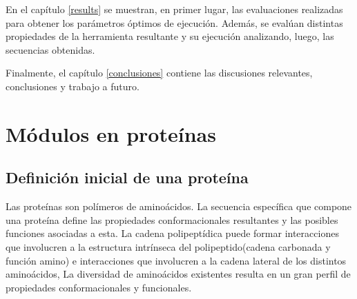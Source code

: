 En el capítulo \ref{results} se muestran, en primer lugar, las evaluaciones realizadas para obtener los parámetros óptimos de ejecución. 
Además, se evalúan distintas propiedades de la herramienta resultante y su ejecución analizando, luego, las secuencias obtenidas. 

Finalmente, el capítulo \ref{conclusiones} contiene las discusiones relevantes, conclusiones y trabajo a futuro.






\section{Módulos en proteínas}
\label{proteinLandscape}
% 

\subsection{Definición inicial de una proteína}
Las proteínas son polímeros de aminoácidos.
La secuencia específica que compone una proteína define las propiedades conformacionales resultantes y las posibles funciones asociadas a esta.
La cadena polipeptídica puede formar interacciones que involucren a la estructura intrínseca del polipeptido(cadena carbonada y función amino) 
e interacciones que involucren a la cadena lateral de los distintos aminoácidos, 
La diversidad de aminoácidos existentes resulta en un gran perfil de propiedades conformacionales y funcionales.

